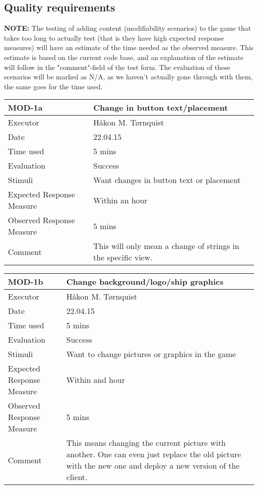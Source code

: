 \subsection{Quality requirements}



\textbf{NOTE:} The testing of adding content (modifiability scenarios) to the game that takes too long to actually test (that is they have high expected response measures) will have an estimate of the time needed as the observed measure. This estimate is based on the current code base, and an explanation of the estimate will follow in the "comment"-field of the test form. The evaluation of these scenarios will be marked as N/A, as we haven't actually gone through with them, the same goes for the time used.

\begin{table}[H]
\begin{tabular}{|l|p{10cm}|}
\hline
\textbf{MOD-1a} & Change in button text/placement \\ \hline
Executor    & Håkon M. Tørnquist            \\ \hline
Date        & 22.04.15         \\ \hline
Time used   & 5 mins        \\ \hline
Evaluation  & Success          \\ \hline
Stimuli     & Want changes in button text or placement \\ \hline
Expected Response Measure & Within an hour \\ \hline
Observed Response Measure & 5 mins\\ \hline
Comment     & This will only mean a change of strings in the specific view.\\ \hline
\end{tabular}
\end{table}

\begin{table}[H]
\begin{tabular}{|l|p{10cm}|}
\hline
\textbf{MOD-1b} & Change background/logo/ship graphics \\ \hline
Executor    & Håkon M. Tørnquist            \\ \hline
Date        & 22.04.15         \\ \hline
Time used   & 5 mins   \\ \hline
Evaluation  & Success           \\ \hline
Stimuli     & Want to change pictures or graphics in the game        \\ \hline
Expected Response Measure &  Within and hour\\ \hline
Observed Response Measure &  5 mins \\ \hline
Comment     & This means changing the current picture with another. One can even just replace the old picture with the new one and deploy a new version of the client.\\ \hline
\end{tabular}
\end{table}


